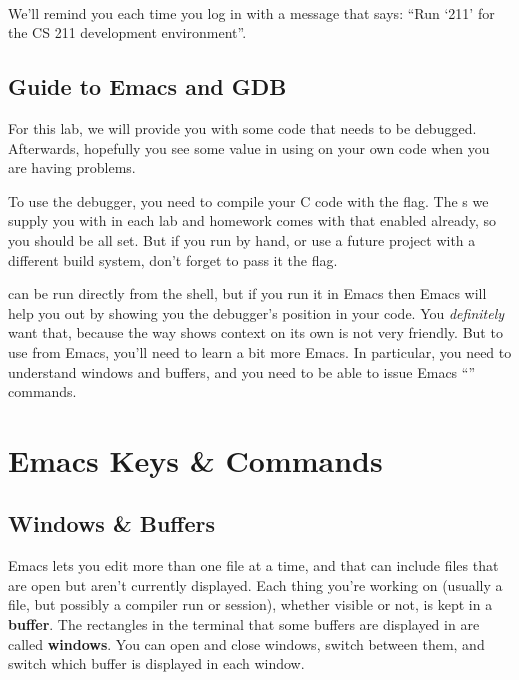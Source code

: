 \documentclass{tufte-handout}
\begin{document}
\begin{CmdLine*}
  \\
\end{CmdLine*}

We'll remind you each time you log in with a message that says: ``Run ‘211’ for
the CS 211 development environment''.


\subsection{Guide to Emacs and GDB}

For this lab, we will provide you with some code that needs to be debugged.
Afterwards, hopefully you see some value in using  on your own
code when you are having problems.

To use the debugger, you need to compile your C code with the 
flag. The s we supply you with in each lab and homework
comes with that enabled already, so you should be all set. But if you run
 by hand, or use a future project with a different build system,
don't forget to pass it the  flag.

 can be run directly from the shell, but if you run it in Emacs then Emacs
will help you out by showing you the debugger’s position in your code. You
\emph{definitely} want that, because the way  shows context on its own is
not very friendly. But to use  from Emacs, you’ll need to learn a bit more
Emacs. In particular, you need to understand windows and buffers, and you need
to be able to issue Emacs “” commands.

\section{Emacs Keys \& Commands}

\subsection{Windows \& Buffers}

Emacs lets you edit more than one file at a time, and that can include
  files that are open but aren’t currently displayed. Each thing you’re
  working on (usually a file, but possibly a compiler run or 
  session), whether visible or not, is kept in a \textbf{buffer}. The
  rectangles in the terminal that some buffers are displayed in are called
  \textbf{windows}. You can open and close windows, switch between them,
  and switch which buffer is displayed in each window.
\end{document}
